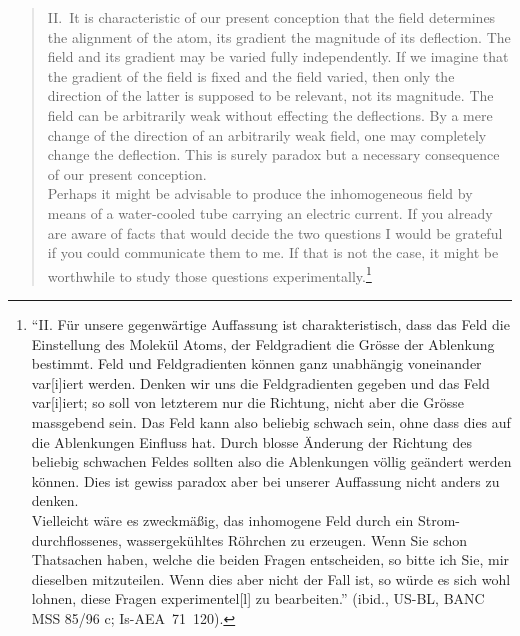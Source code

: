 \documentclass[12pt]{article}
\begin{document}
\begin{quote}
II.~It is characteristic of our present conception that the field determines the alignment of the atom, its gradient the magnitude of its deflection. The field and its gradient may be varied fully independently. If we imagine that the gradient of the field is fixed and the field varied, then only the direction of the latter is supposed to be relevant, not its magnitude. The field can be arbitrarily weak without effecting the deflections. By a mere change of the direction of an arbitrarily weak field, one may completely change the deflection. This is surely paradox but a necessary consequence of our present conception.\\
Perhaps it might be advisable to produce the inhomogeneous field by means of a water-cooled tube carrying an electric current. If you already are aware of facts that would decide the two questions I would be grateful if you could communicate them to me. If that is not the case, it might be worthwhile to study those questions experimentally.\footnote{%
``II. Für unsere gegenwärtige Auffassung ist charakteristisch, dass das Feld die Einstellung des Molekül Atoms, der Feldgradient die Grösse der Ablenkung bestimmt. Feld und Feldgradienten können ganz unabhängig voneinander var[i]iert werden. Denken wir uns die Feldgradienten gegeben und das Feld var[i]iert; so soll von letzterem nur die Richtung, nicht aber die Grösse massgebend sein. Das Feld kann also beliebig schwach sein, ohne dass dies auf die Ablenkungen Einfluss hat. Durch blosse Änderung der Richtung des beliebig schwachen Feldes sollten also die Ablenkungen völlig geändert werden können. Dies ist gewiss paradox aber bei unserer Auffassung nicht anders zu denken.\\
           Vielleicht wäre es zweckmäßig, das inhomogene Feld durch ein Strom-durchflossenes, wassergekühltes Röhrchen zu erzeugen. Wenn Sie schon Thatsachen haben, welche die beiden Fragen entscheiden, so bitte ich Sie, mir dieselben mitzuteilen. Wenn dies aber nicht der Fall ist, so würde es sich wohl lohnen, diese Fragen experimentel[l] zu bearbeiten.''
(ibid., US-BL, BANC MSS 85/96 c; Is-AEA~71~120).
}
\end{quote}
%
\end{document}
